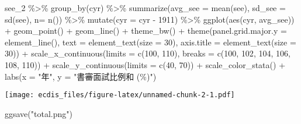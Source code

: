 \documentclass[
]{article}
\newenvironment{Shaded}{\begin{snugshade}}{\end{snugshade}}
\newcommand{\AttributeTok}[1]{\textcolor[rgb]{0.77,0.63,0.00}{#1}}
\newcommand{\DecValTok}[1]{\textcolor[rgb]{0.00,0.00,0.81}{#1}}
\newcommand{\FunctionTok}[1]{\textcolor[rgb]{0.00,0.00,0.00}{#1}}
\newcommand{\NormalTok}[1]{#1}
\newcommand{\SpecialCharTok}[1]{\textcolor[rgb]{0.00,0.00,0.00}{#1}}
\newcommand{\StringTok}[1]{\textcolor[rgb]{0.31,0.60,0.02}{#1}}
\begin{document}
\begin{Shaded}
\begin{Highlighting}[]
\NormalTok{see\_2 }\SpecialCharTok{\%\textgreater{}\%} 
  \FunctionTok{group\_by}\NormalTok{(cyr) }\SpecialCharTok{\%\textgreater{}\%}
  \FunctionTok{summarize}\NormalTok{(}\AttributeTok{avg\_see =} \FunctionTok{mean}\NormalTok{(see),}
            \AttributeTok{sd\_see =} \FunctionTok{sd}\NormalTok{(see), }
            \AttributeTok{n=} \FunctionTok{n}\NormalTok{()) }\SpecialCharTok{\%\textgreater{}\%}
  \FunctionTok{mutate}\NormalTok{(}\AttributeTok{cyr =}\NormalTok{ cyr }\SpecialCharTok{{-}} \DecValTok{1911}\NormalTok{) }\SpecialCharTok{\%\textgreater{}\%}
  \FunctionTok{ggplot}\NormalTok{(}\FunctionTok{aes}\NormalTok{(cyr, avg\_see)) }\SpecialCharTok{+}
  \FunctionTok{geom\_point}\NormalTok{() }\SpecialCharTok{+}
  \FunctionTok{geom\_line}\NormalTok{() }\SpecialCharTok{+}
  \FunctionTok{theme\_bw}\NormalTok{() }\SpecialCharTok{+}
  \FunctionTok{theme}\NormalTok{(}\AttributeTok{panel.grid.major.y =} \FunctionTok{element\_line}\NormalTok{(), }
        \AttributeTok{text =} \FunctionTok{element\_text}\NormalTok{(}\AttributeTok{size =} \DecValTok{30}\NormalTok{), }
        \AttributeTok{axis.title =} \FunctionTok{element\_text}\NormalTok{(}\AttributeTok{size =} \DecValTok{30}\NormalTok{)) }\SpecialCharTok{+}
  \FunctionTok{scale\_x\_continuous}\NormalTok{(}\AttributeTok{limits =} \FunctionTok{c}\NormalTok{(}\DecValTok{100}\NormalTok{, }\DecValTok{110}\NormalTok{), }\AttributeTok{breaks =} \FunctionTok{c}\NormalTok{(}\DecValTok{100}\NormalTok{, }\DecValTok{102}\NormalTok{, }\DecValTok{104}\NormalTok{, }\DecValTok{106}\NormalTok{, }\DecValTok{108}\NormalTok{, }\DecValTok{110}\NormalTok{)) }\SpecialCharTok{+}
  \FunctionTok{scale\_y\_continuous}\NormalTok{(}\AttributeTok{limits =} \FunctionTok{c}\NormalTok{(}\DecValTok{40}\NormalTok{, }\DecValTok{70}\NormalTok{)) }\SpecialCharTok{+}
  \FunctionTok{scale\_color\_stata}\NormalTok{() }\SpecialCharTok{+}
  \FunctionTok{labs}\NormalTok{(}\AttributeTok{x =} \StringTok{"年"}\NormalTok{, }\AttributeTok{y =} \StringTok{"書審面試比例和 (\%)"}\NormalTok{)}
\end{Highlighting}
\end{Shaded}

\texttt{[image: ecdis\_files/figure-latex/unnamed-chunk-2-1.pdf]}

\begin{Shaded}
\begin{Highlighting}[]
\FunctionTok{ggsave}\NormalTok{(}\StringTok{"total.png"}\NormalTok{)}
\end{Highlighting}
\end{Shaded}
\end{document}
